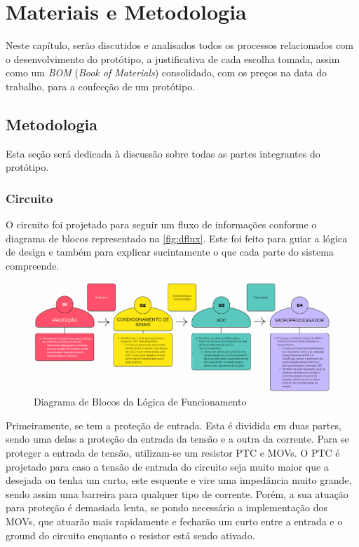 
\chapter{Materiais e Metodologia}\label{cap:materialemetodos}

Neste capítulo, serão discutidos e analisados todos os processos relacionados com o desenvolvimento do protótipo, a justificativa de cada escolha tomada, assim como um \textit{\gls{BOM}} (\textit{Book of Materials}) consolidado, com os preços na data do trabalho, para a confecção de um protótipo.


\section{Metodologia}\label{sec:metodo}

Esta seção será dedicada à discussão sobre todas as partes integrantes do protótipo.

\subsection{Circuito}\label{circuit}

O circuito foi projetado para seguir um fluxo de informações conforme o diagrama de blocos representado na \autoref{fig:dflux}. Este foi feito para guiar a lógica de design e também para explicar sucintamente o que cada parte do sistema compreende.

\begin{figure}[htb!]
    \caption{Diagrama de Blocos da Lógica de Funcionamento}
    \label{fig:dflux}
    \includegraphics[width=1.0\textwidth]{figuras/dblocflux.png}
    \fonte{}
\end{figure}

Primeiramente, se tem a proteção de entrada. Esta é dividida em duas partes, sendo uma delas a proteção da entrada da tensão e a outra da corrente. Para se proteger a entrada de tensão, utilizam-se um resistor \gls{PTC} e \gls{MOV}s. O \gls{PTC} é projetado para caso a tensão de entrada do circuito seja muito maior que a desejada ou tenha um curto, este esquente e vire uma impedância muito grande, sendo assim uma barreira para qualquer tipo de corrente. Porém, a sua atuação para proteção é demasiada lenta, se pondo necessário a implementação dos \gls{MOV}s, que atuarão mais rapidamente e fecharão um curto entre a entrada e o ground do circuito enquanto o resistor está sendo ativado.

